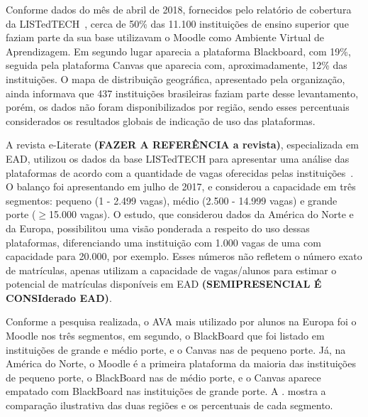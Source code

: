 Conforme dados do mês de  abril de 2018, fornecidos pelo relatório de cobertura da LISTedTECH~\cite{listedtech}, cerca de 50\% das 11.100 instituições de ensino superior que faziam parte da sua base utilizavam o Moodle como Ambiente Virtual de Aprendizagem. Em segundo lugar aparecia a plataforma Blackboard, com 19\%, seguida pela plataforma Canvas que aparecia com, aproximadamente, 12\% das instituições. O mapa de distribuição geográfica, apresentado pela organização, ainda informava que 437 instituições brasileiras faziam parte desse levantamento, porém, os dados não foram disponibilizados por região, sendo esses percentuais considerados os resultados globais de indicação de uso das plataformas.

A revista e-Literate\textbf{ (FAZER A REFERÊNCIA a revista)}, especializada em EAD, utilizou os dados da base LISTedTECH para apresentar uma análise das plataformas de acordo com a quantidade de vagas oferecidas pelas instituições~\cite{phil@lms}. O balanço foi apresentando em julho de 2017, e considerou a capacidade em três segmentos: pequeno (1 - 2.499 vagas), médio (2.500 - 14.999 vagas) e grande porte ($\geq$15.000 vagas). O estudo, que considerou dados da América do Norte e da Europa, possibilitou uma visão ponderada a respeito do uso dessas plataformas, diferenciando uma instituição com 1.000 vagas de uma com capacidade para 20.000, por exemplo. Esses números não refletem o número exato de matrículas, apenas utilizam a capacidade de vagas/alunos para estimar o potencial de matrículas disponíveis em EAD \textbf{(SEMIPRESENCIAL É CONSIderado EAD)}. 

Conforme a pesquisa realizada, o AVA mais utilizado por alunos na Europa foi o Moodle nos três segmentos, em segundo, o BlackBoard que foi listado em instituições de grande e médio porte, e o Canvas nas de pequeno porte. Já, na América do Norte, o Moodle é a primeira plataforma da maioria das instituições de pequeno porte, o BlackBoard nas de médio porte, e o Canvas aparece empatado com BlackBoard nas instituições de grande porte. A . mostra a comparação ilustrativa das duas regiões e os percentuais de cada segmento.

